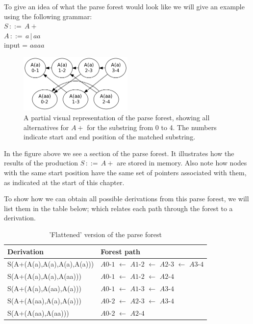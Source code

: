 \documentclass[a4paper,10pt]{article}
\begin{document}
To give an idea of what the parse forest would look like we will give an example using the following grammar:\\
$S\,::=\,A+$\\
$A\,::=\,a\,|\,aa$\\
input = $aaaa$

\begin{figure}[H]
\centering
\includegraphics[width=0.5\textwidth]{a_aa-forest.png}
\caption{A partial visual representation of the parse forest, showing all alternatives for $A+$ for the substring from 0 to 4. The numbers indicate start and end position of the matched substring.}
\end{figure}

In the figure above we see a section of the parse forest. It illustrates how the results of the production $S\,::=\,A+$ are stored in memory. Also note how nodes with the same start position have the same set of pointers associated with them, as indicated at the start of this chapter.

To show how we can obtain all possible derivations from this parse forest, we will list them in the table below; which relates each path through the forest to a derivation.

\begin{table}[H]
\centering
\begin{tabular}{ p{15em} p{15em} }
Derivation & Forest path\\
\hline
S(A+(A(a),A(a),A(a),A(a))) & $A0$-$1$ $\leftarrow$ $A1$-$2$ $\leftarrow$ $A2$-$3$ $\leftarrow$ $A3$-$4$\\
S(A+(A(a),A(a),A(aa))) & $A0$-$1$ $\leftarrow$ $A1$-$2$ $\leftarrow$ $A2$-$4$\\
S(A+(A(a),A(aa),A(a))) & $A0$-$1$ $\leftarrow$ $A1$-$3$ $\leftarrow$ $A3$-$4$\\
S(A+(A(aa),A(a),A(a))) & $A0$-$2$ $\leftarrow$ $A2$-$3$ $\leftarrow$ $A3$-$4$\\
S(A+(A(aa),A(aa))) & $A0$-$2$ $\leftarrow$ $A2$-$4$
\end{tabular}
\caption{'Flattened' version of the parse forest}
\end{table}
\end{document}
